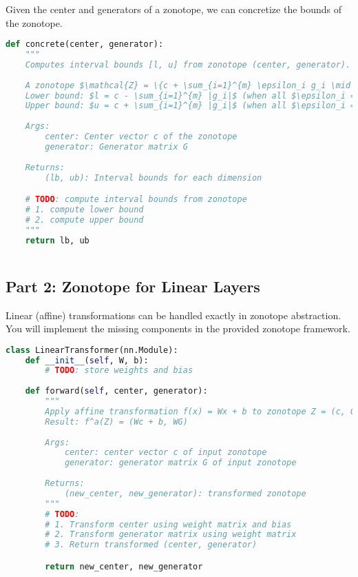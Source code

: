 Given the center and generators of a zonotope, we can concretize the bounds of the zonotope.
\begin{lstlisting}[language=Python]
def concrete(center, generator):
    """
    Computes interval bounds [l, u] from zonotope (center, generator).
    
    A zonotope $\mathcal{Z} = \{c + \sum_{i=1}^{m} \epsilon_i g_i \mid \epsilon_i \in [-1,1]\}$ can be converted to interval bounds:
    Lower bound: $l = c - \sum_{i=1}^{m} |g_i|$ (when all $\epsilon_i = -\text{sign}(g_i)$)
    Upper bound: $u = c + \sum_{i=1}^{m} |g_i|$ (when all $\epsilon_i = +\text{sign}(g_i)$)
    
    Args:
        center: Center vector c of the zonotope
        generator: Generator matrix G 
        
    Returns:
        (lb, ub): Interval bounds for each dimension

    # TODO: compute interval bounds from zonotope
    # 1. compute lower bound
    # 2. compute upper bound
    """
    return lb, ub
    
\end{lstlisting}

\subsection{Part 2: Zonotope for Linear Layers}
Linear (affine) transformations can be handled exactly in zonotope abstraction. You will implement the missing components in the provided zonotope framework.

\begin{lstlisting}[language=Python]
class LinearTransformer(nn.Module):
    def __init__(self, W, b):
        # TODO: store weights and bias
    
    def forward(self, center, generator):
        """
        Apply affine transformation f(x) = Wx + b to zonotope Z = (c, G)
        Result: f^a(Z) = (Wc + b, WG)
        
        Args:
            center: center vector c of input zonotope
            generator: generator matrix G of input zonotope  
            
        Returns:
            (new_center, new_generator): transformed zonotope
        """
        # TODO: 
        # 1. Transform center using weight matrix and bias
        # 2. Transform generator matrix using weight matrix 
        # 3. Return transformed (center, generator)

        return new_center, new_generator

    \end{lstlisting}


